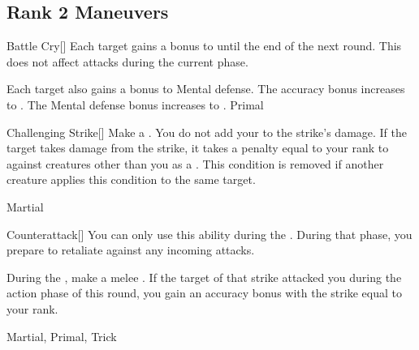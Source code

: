 \subsection{Rank 2 Maneuvers}

\lowercase{\hypertarget{maneuver:Battle Cry}{}}\label{maneuver:Battle Cry}
\hypertarget{maneuver:Battle Cry}{}
\begin{freeability}[Rank 2]{Battle Cry}[]
Each target gains a  bonus to  until the end of the next round.
This does not affect attacks during the current phase.

\rankline
{} Each target also gains a  bonus to Mental defense.
 The accuracy bonus increases to .
 The Mental defense bonus increases to .
 Primal
\end{freeability}
\vspace{0.25em}



\lowercase{\hypertarget{maneuver:Challenging Strike}{}}\label{maneuver:Challenging Strike}
\hypertarget{maneuver:Challenging Strike}{}
\begin{freeability}[Rank 2]{Challenging Strike}[]
Make a .
You do not add your  to the strike's damage.
If the target takes damage from the strike, it takes a penalty equal to your rank to  against creatures other than you as a .
This condition is removed if another creature applies this condition to the same target.


 Martial
\end{freeability}
\vspace{0.25em}



\lowercase{\hypertarget{maneuver:Counterattack}{}}\label{maneuver:Counterattack}
\hypertarget{maneuver:Counterattack}{}
\begin{freeability}[Rank 2]{Counterattack}[]
You can only use this ability during the .
During that phase, you prepare to retaliate against any incoming attacks.

During the , make a melee .
If the target of that strike attacked you during the action phase of this round,
you gain an accuracy bonus with the strike equal to your rank.


 Martial, Primal, Trick
\end{freeability}
\vspace{0.25em}



